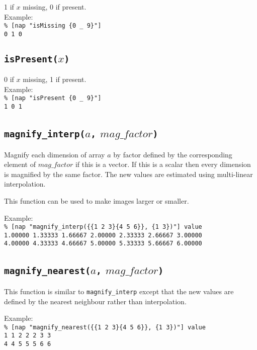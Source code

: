1 if $x$ missing, 0 if present.
\\
Example:
\\
\texttt{\% [nap "isMissing \{0 \_ 9\}"]
\\
0 1 0}

\subsection{\texttt{isPresent(}$x$\texttt{)}}
    \label{nap-function-lib-isPresent}

0 if $x$ missing, 1 if present.
\\
Example:
\\
\texttt{\% [nap "isPresent \{0 \_ 9\}"]
\\1 0 1}

\subsection{\texttt{magnify\_interp(}$a$\texttt{,} $\mathit{mag\_factor}$\texttt{)}
\label{nap-function-lib-magnify-interp}}

Magnify each dimension of array 
$a$ by factor defined by the corresponding element of 
$\mathit{mag\_factor}$ if this is a vector. If this is a scalar then
every dimension is magnified by the same factor. The new values are
estimated using multi-linear interpolation.

This function can be used to make images larger or smaller.

Example:
\\
\texttt{\% [nap "magnify\_interp(\{\{1 2 3\}\{4 5 6\}\}, \{1 3\})"]
value
\\1.00000 1.33333 1.66667 2.00000 2.33333 2.66667 3.00000
\\4.00000 4.33333 4.66667 5.00000 5.33333 5.66667 6.00000}

\subsection{\texttt{magnify\_nearest(}$a$\texttt{,} $\mathit{mag\_factor}$\texttt{)}}
    \label{nap-function-lib-magnify-nearest}

This function is similar to 
\texttt{magnify\_interp} except that the new values are defined by
the nearest neighbour rather than interpolation.

Example:
\\
\texttt{\% [nap "magnify\_nearest(\{\{1 2 3\}\{4 5 6\}\}, \{1 3\})"]
value
\\1 1 2 2 2 3 3
\\4 4 5 5 5 6 6}

